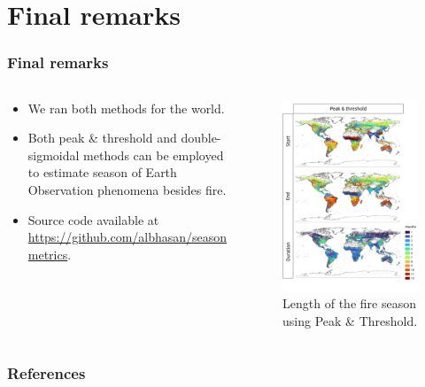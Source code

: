 \documentclass[aspectratio=169]{beamer}
\begin{document}
\section{Final remarks}

\begin{frame}
    \frametitle{Final remarks}
    \begin{columns}
        \begin{column}{0.5\linewidth}
            \begin{itemize}
                \item We ran both methods for the world.
                \item Both peak \& threshold and double-sigmoidal methods can
                    be employed to estimate season of Earth Observation
                    phenomena besides fire.
                \item Source code available at
                    \url{https://github.com/albhasan/seasonmetrics}.
            \end{itemize}
        \end{column}
        \begin{column}{0.5\linewidth}
            \begin{figure}[h]
                \includegraphics[width=0.77\linewidth]
                {./images/pthres_world.png}
                \caption{Length of the fire season using Peak \& Threshold.}
            \end{figure}
        \end{column}
    \end{columns}
\end{frame}

\begin{frame}[allowframebreaks]
    \frametitle{References}
    
    
\end{frame}
\end{document}
